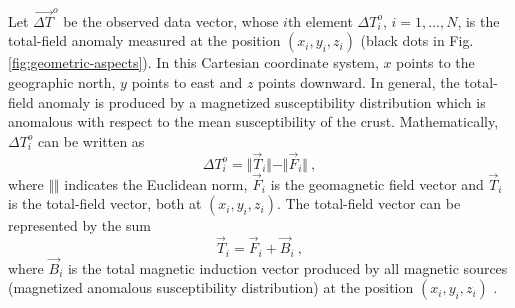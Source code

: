 \documentclass[journal abbreviation, npg]{copernicus}
\begin{document}
Let $\vec{\Delta T}^{o}$ be the observed data vector, whose $i$th element $\Delta T^{o}_{i}$, $i = 1, ..., N$, is the total-field anomaly measured at the position $(x_{i}, y_{i}, z_{i})$ (black dots in Fig. \ref{fig:geometric-aspects}). In this Cartesian coordinate system, $x$ points to the geographic north, $y$ points to east and $z$ points downward. In general, the total-field anomaly is produced by a magnetized  susceptibility distribution which is anomalous with respect to the mean susceptibility of the crust. Mathematically, $\Delta T^{o}_{i}$ can be written as
\begin{equation}
\Delta T^{o}_{i} = \Vert \vec{T}_i \Vert - \Vert \vec{F}_i \Vert \: ,
\label{eq:tfanomaly-i}
\end{equation}
where $\Vert \Vert$ indicates the Euclidean norm, $\vec{F}_i$ is the geomagnetic field vector and $\vec{T}_i$ is the total-field vector, both at $(x_{i}, y_{i}, z_{i})$. The total-field vector can be represented by the sum
\begin{equation}
\vec{T}_i = \vec{F}_i + \vec{B}_i \: ,
\label{eq:tfvector-i}
\end{equation}
where $\vec{B}_i$ is the total magnetic induction vector produced by all magnetic sources (magnetized anomalous susceptibility distribution) at the position $(x_{i}, y_{i}, z_{i})$ \citep{blakely1996, langel-hinze1998}.
\end{document}
